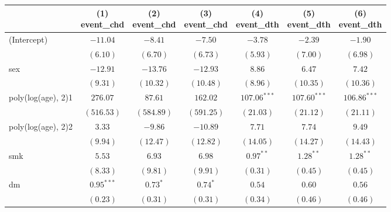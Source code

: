 
\begin{tabular}{l c c c c c c}
\toprule
 & \shortstack{(1) \\ event\_chd} & \shortstack{(2) \\ event\_chd} & \shortstack{(3) \\ event\_chd} & \shortstack{(4) \\ event\_dth} & \shortstack{(5) \\ event\_dth} & \shortstack{(6) \\ event\_dth} \\
\midrule
(Intercept)                       & $-11.04$     & $-8.41$    & $-7.50$    & $-3.78$        & $-2.39$        & $-1.90$        \\
                                  & $(6.10)$     & $(6.70)$   & $(6.73)$   & $(5.93)$       & $(7.00)$       & $(6.98)$       \\
sex                               & $-12.91$     & $-13.76$   & $-12.93$   & $8.86$         & $6.47$         & $7.42$         \\
                                  & $(9.31)$     & $(10.32)$  & $(10.48)$  & $(8.96)$       & $(10.35)$      & $(10.36)$      \\
poly(log(age), 2)1                & $276.07$     & $87.61$    & $162.02$   & $107.06^{***}$ & $107.60^{***}$ & $106.86^{***}$ \\
                                  & $(516.53)$   & $(584.89)$ & $(591.25)$ & $(21.03)$      & $(21.12)$      & $(21.11)$      \\
poly(log(age), 2)2                & $3.33$       & $-9.86$    & $-10.89$   & $7.71$         & $7.74$         & $9.49$         \\
                                  & $(9.94)$     & $(12.47)$  & $(12.82)$  & $(14.05)$      & $(14.27)$      & $(14.43)$      \\
smk                               & $5.53$       & $6.93$     & $6.98$     & $0.97^{**}$    & $1.28^{**}$    & $1.28^{**}$    \\
                                  & $(8.33)$     & $(9.81)$   & $(9.91)$   & $(0.31)$       & $(0.45)$       & $(0.45)$       \\
dm                                & $0.95^{***}$ & $0.73^{*}$ & $0.74^{*}$ & $0.54$         & $0.60$         & $0.56$         \\
                                  & $(0.23)$     & $(0.31)$   & $(0.31)$   & $(0.34)$       & $(0.46)$       & $(0.46)$       \\

\end{tabular}
